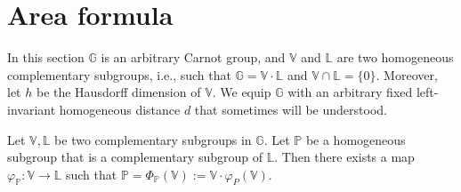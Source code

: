 \documentclass[10pt, a4paper,
oneside, headinclude,footinclude]{scrartcl}
\begin{document}
\section{Area formula}\label{sec:AreaFormula}
In this section $\mathbb G$ is an arbitrary Carnot group, and $\mathbb V$ and $\mathbb L$ are two homogeneous complementary subgroups, i.e., such that $\mathbb G=\mathbb V\cdot\mathbb L$ and $\mathbb V\cap\mathbb L=\{0\}$. Moreover, let $h$ be the Hausdorff dimension of $\mathbb V$. We equip $\mathbb G$ with an arbitrary fixed left-invariant homogeneous distance $d$ that sometimes will be understood.






\begin{lemma}\label{lem:ComplGraph}
Let $\mathbb V,\mathbb L$ be two complementary subgroups in $\mathbb G$. Let $\mathbb P$ be a homogeneous subgroup that is a complementary subgroup of $\mathbb L$. Then there exists a map $\varphi_{\mathbb P}:\mathbb V\to\mathbb L$ such that $\mathbb P=\Phi_{\mathbb P}(\mathbb V):=\mathbb V\cdot\varphi_P(\mathbb V)$.
\end{lemma}


\end{document}
